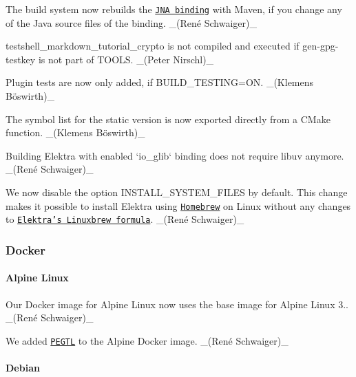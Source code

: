 \begin{DoxyItemize}
\item The build system now rebuilds the \href{https://www.libelektra.org/bindings/jna}{\tt J\+NA binding} with Maven, if you change any of the Java source files of the binding. \+\_\+(René Schwaiger)\+\_\+
\item {\ttfamily testshell\+\_\+markdown\+\_\+tutorial\+\_\+crypto} is not compiled and executed if {\ttfamily gen-\/gpg-\/testkey} is not part of T\+O\+O\+LS. \+\_\+(\+Peter Nirschl)\+\_\+
\item Plugin tests are now only added, if {\ttfamily B\+U\+I\+L\+D\+\_\+\+T\+E\+S\+T\+I\+NG=ON}. \+\_\+(Klemens Böswirth)\+\_\+
\item The symbol list for the static version is now exported directly from a C\+Make function. \+\_\+(Klemens Böswirth)\+\_\+
\item Building Elektra with enabled `io\+\_\+glib` binding does not require libuv anymore. \+\_\+(René Schwaiger)\+\_\+
\item We now disable the option {\ttfamily I\+N\+S\+T\+A\+L\+L\+\_\+\+S\+Y\+S\+T\+E\+M\+\_\+\+F\+I\+L\+ES} by default. This change makes it possible to install Elektra using \href{https://brew.sh}{\tt Homebrew} on Linux without any changes to \href{https://github.com/Homebrew/linuxbrew-core/blob/master/Formula/elektra.rb}{\tt Elektra’s Linuxbrew formula}. \+\_\+(René Schwaiger)\+\_\+
\end{DoxyItemize}

\subsubsection*{Docker}

\paragraph*{Alpine Linux}


\begin{DoxyItemize}
\item Our Docker image for Alpine Linux now uses the base image for Alpine Linux 3.. \+\_\+(René Schwaiger)\+\_\+
\item We added \href{https://github.com/taocpp/PEGTL}{\tt P\+E\+G\+TL} to the Alpine Docker image. \+\_\+(René Schwaiger)\+\_\+
\end{DoxyItemize}

\paragraph*{Debian}


